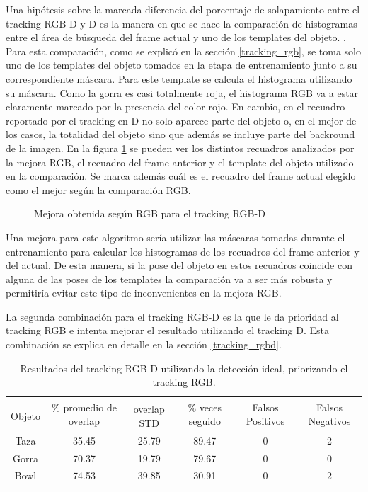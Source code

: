 Una hipótesis sobre la marcada diferencia del porcentaje de solapamiento entre el tracking RGB-D y D es la manera en que se hace la comparación de histogramas entre el área de búsqueda del frame actual y uno de los templates del objeto. . Para esta comparación, como se explicó en la sección \ref{tracking_rgb}, se toma solo uno de los templates del objeto tomados en la etapa de entrenamiento junto a su correspondiente máscara. Para este template se calcula el histograma utilizando su máscara. Como la gorra es casi totalmente roja, el histograma RGB va a estar claramente marcado por la presencia del color rojo. En cambio, en el recuadro reportado por el tracking en D no solo aparece parte del objeto o, en el mejor de los casos, la totalidad del objeto sino que además se incluye parte del backround de la imagen. En la figura \ref{mejora_rgb_en_tracking_rgbd} se pueden ver los distintos recuadros analizados por la mejora RGB, el recuadro del frame anterior y el template del objeto utilizado en la comparación. Se marca además cuál es el recuadro del frame actual elegido como el mejor según la comparación RGB.

\begin{figure}
	\caption{Mejora obtenida según RGB para el tracking RGB-D}
	\label{mejora_rgb_en_tracking_rgbd}
\end{figure}

Una mejora para este algoritmo sería utilizar las máscaras tomadas durante el entrenamiento para calcular los histogramas de los recuadros del frame anterior y del actual. De esta manera, si la pose del objeto en estos recuadros coincide con alguna de las poses de los templates la comparación va a ser más robusta y permitiría evitar este tipo de inconvenientes en la mejora RGB.


La segunda combinación para el tracking RGB-D es la que le da prioridad al tracking RGB e intenta mejorar el resultado utilizando el tracking D. Esta combinación se explica en detalle en la sección \ref{tracking_rgbd}.

\begin{table}
    \begin{tabular}{|c|c|c|c|c|c|}
    \hline
    & \multirow{2}{2.4cm}{\% promedio de overlap} & & \multirow{2}{2cm}{\% veces seguido} & \multirow{2}{1.6cm}{Falsos Positivos} & \multirow{2}{1.6cm}{Falsos Negativos}\\
	Objeto & & overlap STD & & &\\
    \hline
    Taza   & 35.45      & 25.79       & 89.47             & 0                & 2\\
    \hline
    Gorra  & 70.37      & 19.79       & 79.67             & 0                & 0\\
    \hline
    Bowl   & 74.53      & 39.85       & 30.91             & 0                & 2\\
    \hline
    \end{tabular}
\caption{Resultados del tracking RGB-D utilizando la detección ideal, priorizando el tracking RGB.}
\label{tabla_rgbd_rgb}
\end{table}


